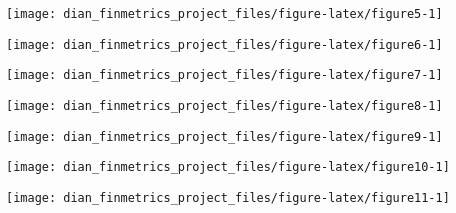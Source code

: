\documentclass[11pt,preprint, authoryear]{elsarticle}
\let\origfigure\figure
\let\endorigfigure\endfigure
\renewenvironment{figure}[1][2] {
    \expandafter\origfigure\expandafter[H]
} {
    \endorigfigure
}
\numberwithin{equation}{section}
\numberwithin{figure}{section}
\numberwithin{table}{section}
\begin{document}
\begin{figure}[H]

{\centering \texttt{[image: dian\_finmetrics\_project\_files/figure-latex/figure5-1]} 

}

\caption{Dynanmic correlation \label{figure5}}\label{fig:figure5}
\end{figure}

\begin{figure}[H]

{\centering \texttt{[image: dian\_finmetrics\_project\_files/figure-latex/figure6-1]} 

}

\caption{Dynanmic correlation \label{figure6}}\label{fig:figure6}
\end{figure}

\begin{figure}[H]

{\centering \texttt{[image: dian\_finmetrics\_project\_files/figure-latex/figure7-1]} 

}

\caption{Dynanmic correlation \label{figure7}}\label{fig:figure7}
\end{figure}

\begin{figure}[H]

{\centering \texttt{[image: dian\_finmetrics\_project\_files/figure-latex/figure8-1]} 

}

\caption{Dynanmic correlation \label{figure8}}\label{fig:figure8}
\end{figure}

\begin{figure}[H]

{\centering \texttt{[image: dian\_finmetrics\_project\_files/figure-latex/figure9-1]} 

}

\caption{Dynanmic correlation \label{figure9}}\label{fig:figure9}
\end{figure}

\begin{figure}[H]

{\centering \texttt{[image: dian\_finmetrics\_project\_files/figure-latex/figure10-1]} 

}

\caption{Dynanmic correlation \label{figure10}}\label{fig:figure10}
\end{figure}

\begin{figure}[H]

{\centering \texttt{[image: dian\_finmetrics\_project\_files/figure-latex/figure11-1]} 

}

\caption{Dynanmic correlation \label{figure11}}\label{fig:figure11}
\end{figure}
\end{document}
